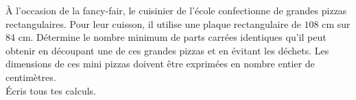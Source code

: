 %
%
À l'occasion de la fancy-fair, le cuisinier de l'école confectionne de grandes pizzas rectangulaires. Pour leur cuisson, il utilise une plaque rectangulaire de $108$ cm sur $84$ cm. Détermine le nombre minimum de parts carrées identiques qu'il peut obtenir en découpant une de ces grandes pizzas et en évitant les déchets. Les dimensions de ces mini pizzas doivent être exprimées en nombre entier de centimètres. \\
    Écris tous tes calculs.
